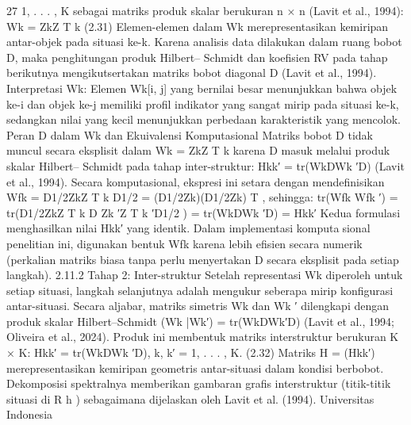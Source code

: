 27
1, . . . , K sebagai matriks produk skalar berukuran n × n (Lavit et al., 1994):
Wk = ZkZ
T
k
(2.31)
Elemen-elemen dalam Wk merepresentasikan kemiripan antar-objek pada situasi ke-k.
Karena analisis data dilakukan dalam ruang bobot D, maka penghitungan produk Hilbert–
Schmidt dan koefisien RV pada tahap berikutnya mengikutsertakan matriks bobot diagonal
D (Lavit et al., 1994).
Interpretasi Wk: Elemen Wk[i, j] yang bernilai besar menunjukkan bahwa objek ke-i
dan objek ke-j memiliki profil indikator yang sangat mirip pada situasi ke-k, sedangkan
nilai yang kecil menunjukkan perbedaan karakteristik yang mencolok.
Peran D dalam Wk dan Ekuivalensi Komputasional Matriks bobot D tidak muncul
secara eksplisit dalam Wk = ZkZ
T
k
karena D masuk melalui produk skalar Hilbert–
Schmidt pada tahap inter-struktur: Hkk′ = tr(WkDWk
′D) (Lavit et al., 1994). Secara
komputasional, ekspresi ini setara dengan mendefinisikan Wfk = D1/2ZkZ
T
k D1/2 =
(D1/2Zk)(D1/2Zk)
T
, sehingga:
tr(Wfk Wfk
′) = tr(D1/2ZkZ
T
k D Zk
′Z
T
k
′D1/2
) = tr(WkDWk
′D) = Hkk′
Kedua formulasi menghasilkan nilai Hkk′ yang identik. Dalam implementasi komputasional penelitian ini, digunakan bentuk Wfk karena lebih efisien secara numerik (perkalian
matriks biasa tanpa perlu menyertakan D secara eksplisit pada setiap langkah).
2.11.2 Tahap 2: Inter-struktur
Setelah representasi Wk diperoleh untuk setiap situasi, langkah selanjutnya adalah
mengukur seberapa mirip konfigurasi antar-situasi. Secara aljabar, matriks simetris Wk dan
Wk
′ dilengkapi dengan produk skalar Hilbert–Schmidt (Wk |Wk′) = tr(WkDWk′D)
(Lavit et al., 1994; Oliveira et al., 2024). Produk ini membentuk matriks interstruktur
berukuran K × K:
Hkk′ = tr(WkDWk
′D), k, k′ = 1, . . . , K. (2.32)
Matriks H = (Hkk′) merepresentasikan kemiripan geometris antar-situasi dalam kondisi
berbobot. Dekomposisi spektralnya memberikan gambaran grafis interstruktur (titik-titik
situasi di R
h
) sebagaimana dijelaskan oleh Lavit et al. (1994).
Universitas Indonesia

